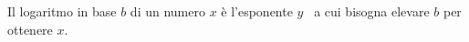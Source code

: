 \documentclass[preview]{standalone}
\begin{document}
\begin{center}
Il logaritmo in base $b$ di un numero $x$ è l'esponente $y$ \ a cui bisogna elevare $b$ per ottenere $x$.
\end{center}
\end{document}

